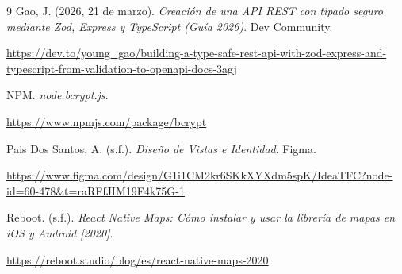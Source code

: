 \documentclass[a4paper,11pt]{article}
\begin{document}
\begin{thebibliography}{9}
    Gao, J. (2026, 21 de marzo). \textit{Creación de una API REST con tipado seguro mediante Zod, Express y TypeScript (Guía 2026)}. Dev Community.

    \url{https://dev.to/young_gao/building-a-type-safe-rest-api-with-zod-express-and-typescript-from-validation-to-openapi-docs-3agj}

    \vspace{0.3cm}

    NPM. \textit{node.bcrypt.js}.

    \url{https://www.npmjs.com/package/bcrypt}

    \vspace{0.3cm}

    Pais Dos Santos, A. (s.f.). \textit{Diseño de Vistas e Identidad}. Figma.

    \url{https://www.figma.com/design/G1i1CM2kr6SKkXYXdm5spK/IdeaTFC?node-id=60-478&t=raRFfJIM19F4k75G-1}

    \vspace{0.3cm}

    Reboot. (s.f.). \textit{React Native Maps: Cómo instalar y usar la librería de mapas en iOS y Android [2020]}. 

    \url{https://reboot.studio/blog/es/react-native-maps-2020}

\end{thebibliography}
\end{document}
